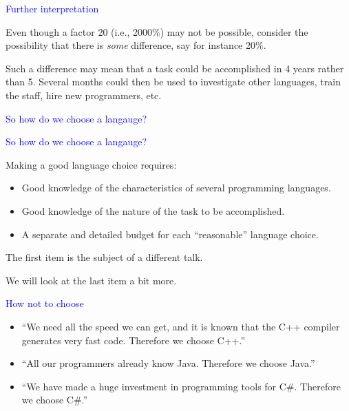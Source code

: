 \documentclass{slides}
\newcommand{\ti}[1]{\begin{center}\Large{\textcolor{blue}{#1}}\end{center}}
\begin{document}
\begin{slide}\ti{Further interpretation}

Even though a factor 20 (i.e., 2000\%) may not be possible, consider
the possibility that there is \emph{some} difference, say for instance
20\%.

Such a difference may mean that a task could be accomplished in 4
years rather than 5.  Several months could then be used to investigate
other languages, train the staff, hire new programmers, etc.

\vfill\end{slide}
\begin{slide}\ti{So how do we choose a langauge?}

\vfill\end{slide}
\begin{slide}\ti{So how do we choose a langauge?}

Making a good language choice requires:

\begin{itemize}
\item Good knowledge of the characteristics of several programming
  languages.
\item Good knowledge of the nature of the task to be accomplished.
\item A separate and detailed budget for each ``reasonable'' language
  choice.
\end{itemize}

The first item is the subject of a different talk.

We will look at the last item a bit more.

\vfill\end{slide}
\begin{slide}\ti{How not to choose}

  \begin{itemize}
  \item ``We need all the speed we can get, and it is known that the
    C++ compiler generates very fast code.  Therefore we choose C++.''
  \item ``All our programmers already know Java.  Therefore we choose
    Java.''
  \item ``We have made a huge investment in programming tools for
    C\#.  Therefore we choose C\#.''
  \end{itemize}

\vfill\end{slide}
\end{document}

